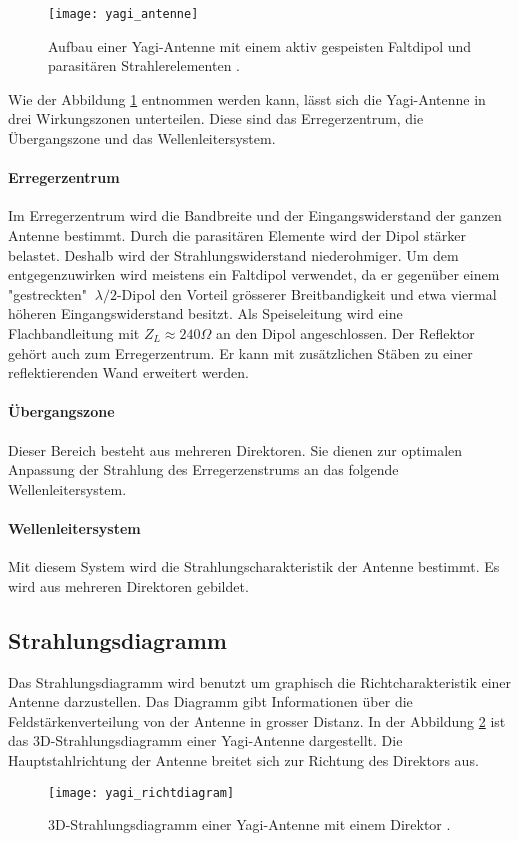 \begin{figure}[H]
	\centering
	\texttt{[image: yagi\_antenne]}
	\caption{Aufbau einer Yagi-Antenne mit einem aktiv gespeisten Faltdipol und parasitären Strahlerelementen \cite{book}.}\label{fig:yagi}
\end{figure}

Wie der Abbildung \ref{fig:yagi} entnommen werden kann, lässt sich die Yagi-Antenne in drei Wirkungszonen unterteilen. Diese sind das Erregerzentrum, die Übergangszone und das Wellenleitersystem.

\paragraph{Erregerzentrum}
Im Erregerzentrum wird die Bandbreite und der Eingangswiderstand der ganzen Antenne bestimmt. Durch die parasitären Elemente wird der Dipol stärker belastet. Deshalb wird der Strahlungswiderstand niederohmiger. Um dem entgegenzuwirken wird meistens ein Faltdipol verwendet, da er gegenüber einem "gestreckten" $\ \lambda/2 $-Dipol den Vorteil grösserer Breitbandigkeit und etwa viermal höheren Eingangswiderstand besitzt. Als Speiseleitung wird eine Flachbandleitung mit $ Z_{L} \approx 240\Omega $ an den Dipol angeschlossen. Der Reflektor gehört auch zum Erregerzentrum. Er kann mit zusätzlichen Stäben zu einer reflektierenden Wand erweitert werden.

\paragraph{Übergangszone}
Dieser Bereich besteht aus mehreren Direktoren. Sie dienen zur optimalen Anpassung der Strahlung des Erregerzenstrums an das folgende Wellenleitersystem.

\paragraph{Wellenleitersystem}
Mit diesem System wird die Strahlungscharakteristik der Antenne bestimmt. Es wird aus mehreren Direktoren gebildet.

\subsection{Strahlungsdiagramm}\label{sec:Strahlungsdiagramm}

Das Strahlungsdiagramm wird benutzt um  graphisch die Richtcharakteristik einer Antenne darzustellen. Das Diagramm gibt Informationen über die Feldstärkenverteilung von der Antenne in grosser Distanz. In der Abbildung \ref{fig:richtdiagram} ist das 3D-Strahlungsdiagramm einer Yagi-Antenne dargestellt. Die Hauptstahlrichtung der Antenne breitet sich zur Richtung des Direktors aus.

\begin{figure}[H]
	\centering
	\texttt{[image: yagi\_richtdiagram]}
	\caption{3D-Strahlungsdiagramm einer Yagi-Antenne mit einem Direktor \cite{script}.}\label{fig:richtdiagram}
\end{figure}
